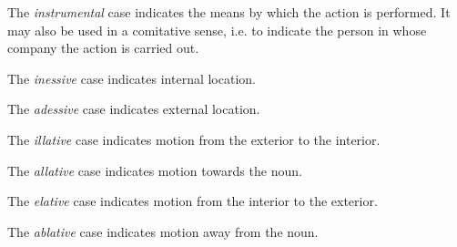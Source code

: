 \documentclass[grammar]{subfiles}
\begin{document}
  The \emph{instrumental} case indicates the means by which the action is performed. It may also be used in a comitative sense, i.e. to indicate the person in whose company the action is carried out.


  The \emph{inessive} case indicates internal location. 


  The \emph{adessive} case indicates external location.


  The \emph{illative} case indicates motion from the exterior to the interior.


  The \emph{allative} case indicates motion towards the noun.


  The \emph{elative} case indicates motion from the interior to the exterior.


  The \emph{ablative} case indicates motion away from the noun.

\end{document}

